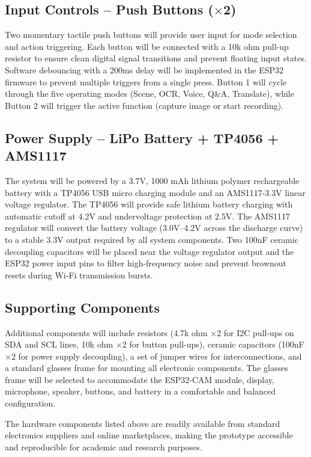 \subsection{Input Controls -- Push Buttons ($\times$2)}
Two momentary tactile push buttons will provide user input for mode selection and action triggering. Each button will be connected with a 10k ohm pull-up resistor to ensure clean digital signal transitions and prevent floating input states. Software debouncing with a 200ms delay will be implemented in the ESP32 firmware to prevent multiple triggers from a single press. Button 1 will cycle through the five operating modes (Scene, OCR, Voice, Q\&A, Translate), while Button 2 will trigger the active function (capture image or start recording).

\subsection{Power Supply -- LiPo Battery + TP4056 + AMS1117}
The system will be powered by a 3.7V, 1000 mAh lithium polymer rechargeable battery with a TP4056 USB micro charging module and an AMS1117-3.3V linear voltage regulator. The TP4056 will provide safe lithium battery charging with automatic cutoff at 4.2V and undervoltage protection at 2.5V. The AMS1117 regulator will convert the battery voltage (3.0V--4.2V across the discharge curve) to a stable 3.3V output required by all system components. Two 100nF ceramic decoupling capacitors will be placed near the voltage regulator output and the ESP32 power input pins to filter high-frequency noise and prevent brownout resets during Wi-Fi transmission bursts.

\subsection{Supporting Components}
Additional components will include resistors (4.7k ohm $\times$2 for I2C pull-ups on SDA and SCL lines, 10k ohm $\times$2 for button pull-ups), ceramic capacitors (100nF $\times$2 for power supply decoupling), a set of jumper wires for interconnections, and a standard glasses frame for mounting all electronic components. The glasses frame will be selected to accommodate the ESP32-CAM module, display, microphone, speaker, buttons, and battery in a comfortable and balanced configuration.

\vspace{0.5cm}
\noindent The hardware components listed above are readily available from standard electronics suppliers and online marketplaces, making the prototype accessible and reproducible for academic and research purposes.

